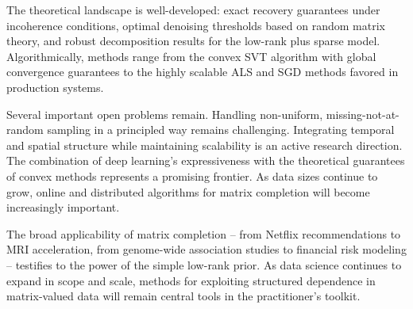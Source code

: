 \documentclass[conference]{IEEEtran}
\begin{document}
The theoretical landscape is well-developed: exact recovery guarantees under incoherence conditions, optimal denoising thresholds based on random matrix theory, and robust decomposition results for the low-rank plus sparse model. Algorithmically, methods range from the convex SVT algorithm with global convergence guarantees to the highly scalable ALS and SGD methods favored in production systems.

Several important open problems remain. Handling non-uniform, missing-not-at-random sampling in a principled way remains challenging. Integrating temporal and spatial structure while maintaining scalability is an active research direction. The combination of deep learning's expressiveness with the theoretical guarantees of convex methods represents a promising frontier. As data sizes continue to grow, online and distributed algorithms for matrix completion will become increasingly important.

The broad applicability of matrix completion -- from Netflix recommendations to MRI acceleration, from genome-wide association studies to financial risk modeling -- testifies to the power of the simple low-rank prior. As data science continues to expand in scope and scale, methods for exploiting structured dependence in matrix-valued data will remain central tools in the practitioner's toolkit.
\end{document}

